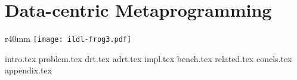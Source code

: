 \chapter{Data-centric Metaprogramming}
\label{chapter:ildl}

\begin{wrapfigure}{r}{40mm}
  \centering
  \vspace{-27em}
  \texttt{[image: ildl-frog3.pdf]}
  \vspace{-27em}
\end{wrapfigure}

{intro.tex}
{problem.tex}
{drt.tex}
{adrt.tex}
{impl.tex}
{bench.tex}
{related.tex}
{concls.tex}
\newpage
{appendix.tex}
